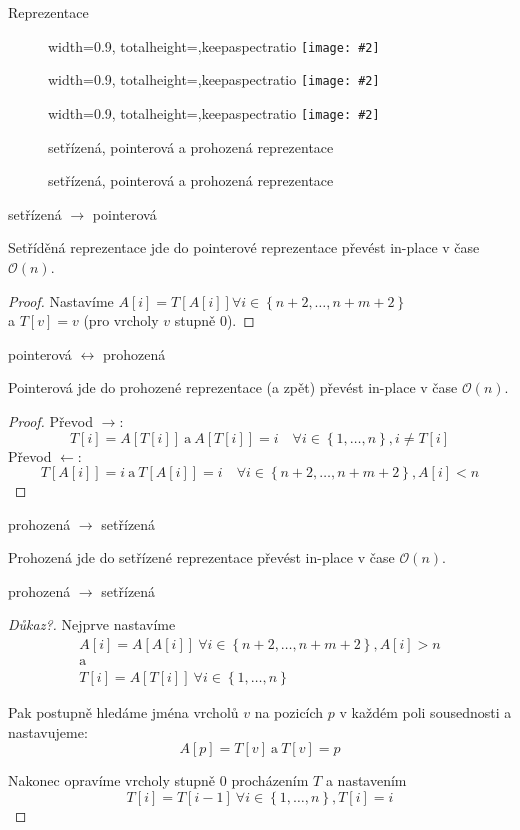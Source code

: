 \documentclass[czech]{beamer}
\makeatletter
\newcommand{\fitimage}[2][\@nil]{
	\begin{figure}
		\begin{adjustbox}{width=0.9\textwidth, totalheight=\textheight-2\baselineskip-2\baselineskip,keepaspectratio}
			\texttt{[image: \#2]}
		\end{adjustbox}
		\def\tmp{#1}%
	 \ifx\tmp\@nnil
			\else
			\caption{#1}
		\fi
	\end{figure}
}
\makeatother
\begin{document}
	\begin{frame}{Reprezentace}
		\fitimage{images/sorted.png}
		\fitimage{images/pointer.png}
		\fitimage[setřízená, pointerová a prohozená reprezentace]{images/swapped.png}
	\end{frame}

	\begin{frame}{setřízená $\rightarrow$ pointerová}
		\begin{lemma}
			Setříděná reprezentace jde do pointerové reprezentace převést in-place v čase $\mathcal{O}\left(n\right)$.
		\end{lemma}

		\begin{proof}
			Nastavíme $A[i] = T\left[A\left[i\right]\right] \forall i \in \left\{n + 2, \ldots, n + m + 2\right\}$ \\
			a $T\left[v\right] = v$ (pro vrcholy $v$ stupně $0$).
		\end{proof}
	\end{frame}

	\begin{frame}{pointerová $\longleftrightarrow$ prohozená}
		\begin{lemma}
			Pointerová jde do prohozené reprezentace (a zpět) převést in-place v čase $\mathcal{O}\left(n\right)$.
		\end{lemma}

		\begin{proof}
			Převod $\rightarrow$: $$T[i] = A[T[i]]\ \text{a}\ A[T[i]] = i\quad \forall i \in \left\{1, \ldots, n\right\}, i \neq T[i]$$
			Převod $\leftarrow$: $$T[A[i]] = i\ \text{a}\ T[A[i]] = i \quad \forall i \in \left\{n + 2, \ldots, n + m + 2\right\}, A[i] < n$$
		\end{proof}
	\end{frame}

	\begin{frame}{prohozená $\rightarrow$ setřízená}
		\begin{lemma}
			Prohozená jde do setřízené reprezentace převést in-place v čase $\mathcal{O}\left(n\right)$.
		\end{lemma}
	\end{frame}

	\begin{frame}{prohozená $\rightarrow$ setřízená}
		\begin{proof}[Důkaz?]
			\small
			Nejprve nastavíme 
			\begin{gather*}
				A[i] = A[A[i]]\ \forall i \in \left\{n + 2, \ldots, n + m + 2\right\}, A[i] > n \\
				\text{a} \\
				T[i] = A[T[i]]\ \forall i \in \left\{1, \ldots, n\right\}
			\end{gather*}

			Pak postupně hledáme jména vrcholů $v$ na pozicích $p$ v každém poli sousednosti a nastavujeme:
			$$A[p] = T[v]\ \text{a}\ T\left[v\right] = p$$

			Nakonec opravíme vrcholy stupně $0$ procházením $T$ a nastavením
			$$T[i] = T[i - 1]\ \forall i \in \left\{1, \ldots, n\right\}, T[i] = i$$
		\end{proof}
	\end{frame}
\end{document}
